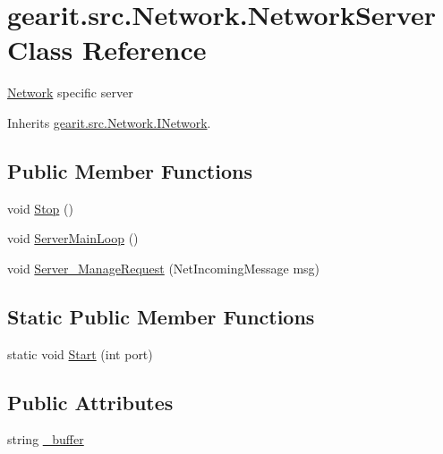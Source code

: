 \hypertarget{classgearit_1_1src_1_1_network_1_1_network_server}{\section{gearit.\+src.\+Network.\+Network\+Server Class Reference}
\label{classgearit_1_1src_1_1_network_1_1_network_server}
}


\hyperlink{namespacegearit_1_1src_1_1_network}{Network} specific server  




Inherits \hyperlink{classgearit_1_1src_1_1_network_1_1_i_network}{gearit.\+src.\+Network.\+I\+Network}.

\subsection*{Public Member Functions}
\begin{DoxyCompactItemize}
\item 
void \hyperlink{classgearit_1_1src_1_1_network_1_1_network_server_afa35d0084398b49eca5cd4ad48dd34b8}{Stop} ()
\item 
void \hyperlink{classgearit_1_1src_1_1_network_1_1_network_server_a293b488293014a5e13a9613eafe2cc4b}{Server\+Main\+Loop} ()
\item 
void \hyperlink{classgearit_1_1src_1_1_network_1_1_network_server_a7b773b09e78fa32873b2b4df6b2665e0}{Server\+\_\+\+Manage\+Request} (Net\+Incoming\+Message msg)
\end{DoxyCompactItemize}
\subsection*{Static Public Member Functions}
\begin{DoxyCompactItemize}
\item 
static void \hyperlink{classgearit_1_1src_1_1_network_1_1_network_server_a4a37120c3865fd4edf4a70590efc9499}{Start} (int port)
\end{DoxyCompactItemize}
\subsection*{Public Attributes}
\begin{DoxyCompactItemize}
\item 
string \hyperlink{classgearit_1_1src_1_1_network_1_1_network_server_aff0349d8a14eb10ceb574a5137532d8c}{\+\_\+buffer}
\end{DoxyCompactItemize}
